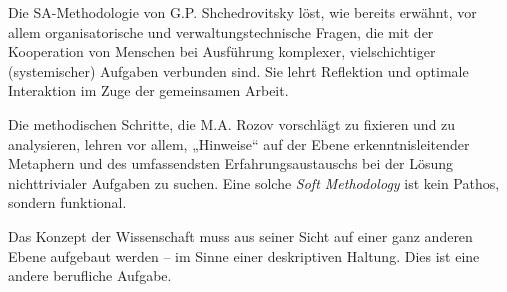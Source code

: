 \documentclass[11pt,a4paper]{article}
\begin{document}
Die SA-Methodologie von G.P. Shchedrovitsky löst, wie bereits erwähnt, vor
allem organisatorische und verwaltungstechnische Fragen, die mit der
Kooperation von Menschen bei Ausführung komplexer, vielschichtiger
(systemischer) Aufgaben verbunden sind. Sie lehrt Reflektion und optimale
Interaktion im Zuge der gemeinsamen Arbeit.

Die methodischen Schritte, die M.A. Rozov vorschlägt zu fixieren und zu
analysieren, lehren vor allem, „Hinweise“ auf der Ebene erkenntnisleitender
Metaphern und des umfassendsten Erfahrungsaustauschs bei der Lösung
nichttrivialer Aufgaben zu suchen. Eine solche \emph{Soft Methodology} ist
kein Pathos, sondern funktional.

Das Konzept der Wissenschaft muss aus seiner Sicht auf einer ganz anderen
Ebene aufgebaut werden -- im Sinne einer deskriptiven Haltung. Dies ist eine
andere beruf\-liche Aufgabe.
\end{document}
